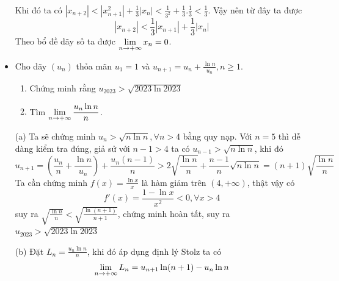 \documentclass[11pt]{scrartcl}
\begin{document}
\begin{itemize}[label=, leftmargin=0em, itemsep=0.5em]
\begin{sol}
        Khi đó ta có $|x_{n + 2}| < |x_{n + 1}^2| + \frac{1}{3}|x_n| < \frac{1}{3^2} + \frac{1}{3}.\frac{1}{3} < \frac{1}{3}$. Vậy nên từ đây ta được 
        \[
         |x_{n + 2}| < \frac{1}{3}|x_{n + 1}| + \frac{1}{3}|x_n|
        \]
        Theo bổ đề dãy số ta được $\displaystyle\lim_{n \to +\infty} x_n = 0$.
    \end{sol}
    \item \begin{bt}
        Cho dãy $(u_n)$ thỏa mãn $u_1 = 1$ và $u_{n + 1} = u_n + \frac{\ln n}{u_n}, n \geq 1$.
        \begin{enumerate}[label=(\alph*)]
            \item Chứng minh rằng $u_{2023} > \sqrt{2023 \ln 2023}$
            \item Tìm $\dlim\frac{u_n  \ln n}{n}$.
        \end{enumerate}
    \end{bt}
    \begin{sol}
        (a) Ta sẽ chứng minh $u_n >\sqrt{n\ln n}, \forall n > 4$ bằng quy nạp. Với $n = 5$ thì dễ dàng kiểm tra đúng, giả sử với $n - 1 > 4$ ta có $u_{n - 1} > \sqrt{n\ln n}$, khi đó 
        \[
            u_{n + 1} = \left(\frac{u_n}{n} + \frac{\ln n}{u_n}\right) + \frac{u_n(n - 1)}{n} > 2\sqrt{\frac{\ln n}{n}} +  \frac{n - 1}{n} \sqrt{n\ln n} = (n + 1)\sqrt{\frac{\ln n}{n}}
        \]
        Ta cần chứng minh $f(x) = \frac{\ln x}{x}$ là hàm giảm trên $(4,+\infty)$, thật vậy có $$f'(x) = \frac{1 - \ln x}{x^2} < 0, \forall x > 4$$ suy ra $\sqrt{\frac{\ln n}{n}} < \sqrt{\frac{\ln(n + 1)}{n + 1}}$, chứng minh hoàn tất, suy ra $u_{2023} > \sqrt{2023\ln2023}$

        (b) Đặt $L_n = \frac{u_n \ln n }{n}$, khi đó áp dụng định lý Stolz ta có $$\displaystyle\lim_{n \to +\infty} L_n = u_{n + 1}\ln(n + 1) - u_n\ln n$$
        

\end{sol}
\end{itemize}
\end{document}
